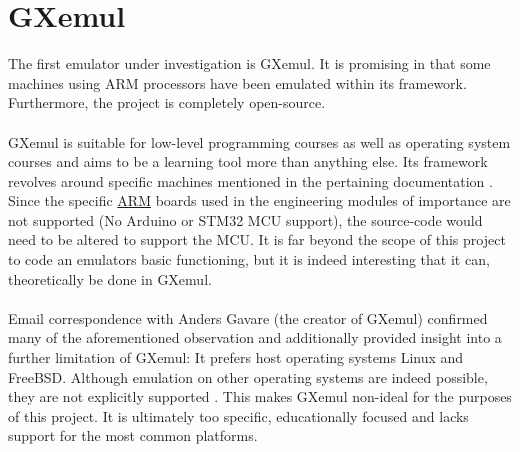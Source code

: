 \section{GXemul}
\label{GXemul}
The first emulator under investigation is GXemul. It is promising in that some machines using ARM processors have been emulated within its framework. Furthermore, the project is completely open-source. \cite{Gavare}
\\\\
GXemul is suitable for low-level programming courses as well as operating system courses and aims to be a learning tool more than anything else. Its framework revolves around specific machines mentioned in the pertaining documentation \cite{Gavare} \cite{gavareEmail}. Since the specific \hyperref[listAbr]{ARM} boards used in the engineering modules of importance are not supported (No Arduino or STM32 MCU support), the source-code would need to be altered to support the MCU. It is far beyond the scope of this project to code an emulators basic functioning, but it is indeed interesting that it can, theoretically be done in GXemul.
\\\\
Email correspondence with Anders Gavare (the creator of GXemul) confirmed many of the aforementioned observation and additionally provided insight into a further limitation of GXemul: It prefers host operating systems Linux and FreeBSD. Although emulation on other operating systems are indeed possible, they are not explicitly supported \cite{gavareEmail}. This makes GXemul non-ideal for the purposes of this project. It is ultimately too specific, educationally focused and lacks support for the most common platforms.
 
